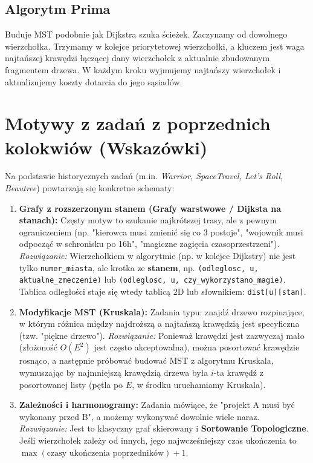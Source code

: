 \documentclass[12pt, a4paper]{article}
\begin{document}
\subsection{Algorytm Prima}
Buduje MST podobnie jak Dijkstra szuka ścieżek. Zaczynamy od dowolnego wierzchołka. Trzymamy w kolejce priorytetowej wierzchołki, a kluczem jest waga najtańszej krawędzi łączącej dany wierzchołek z aktualnie zbudowanym fragmentem drzewa. W każdym kroku wyjmujemy najtańszy wierzchołek i aktualizujemy koszty dotarcia do jego sąsiadów.

\section{Motywy z zadań z poprzednich kolokwiów (Wskazówki)}

Na podstawie historycznych zadań (m.in. \textit{Warrior, SpaceTravel, Let's Roll, Beautree}) powtarzają się konkretne schematy:

\begin{enumerate}
    \item \textbf{Grafy z rozszerzonym stanem (Grafy warstwowe / Dijksta na stanach):}
    Częsty motyw to szukanie najkrótszej trasy, ale z pewnym ograniczeniem (np. "kierowca musi zmienić się co 3 postoje", "wojownik musi odpocząć w schronisku po 16h", "magiczne zagięcia czasoprzestrzeni").
    \textit{Rozwiązanie:} Wierzchołkiem w algorytmie (np. w kolejce Dijkstry) nie jest tylko \texttt{numer\_miasta}, ale krotka ze \textbf{stanem}, np. \texttt{(odleglosc, u, aktualne\_zmeczenie)} lub \texttt{(odleglosc, u, czy\_wykorzystano\_magie)}. Tablica odległości staje się wtedy tablicą 2D lub słownikiem: \texttt{dist[u][stan]}.
    
    \item \textbf{Modyfikacje MST (Kruskala):}
    Zadania typu: znajdź drzewo rozpinające, w którym różnica między najdroższą a najtańszą krawędzią jest specyficzna (tzw. "piękne drzewo"). 
    \textit{Rozwiązanie:} Ponieważ krawędzi jest zazwyczaj mało (złożoność $O(E^2)$ jest często akceptowalna), można posortować krawędzie rosnąco, a następnie próbować budować MST z algorytmu Kruskala, wymuszając by najmniejszą krawędzią drzewa była $i$-ta krawędź z posortowanej listy (pętla po $E$, w środku uruchamiamy Kruskala).
    
    \item \textbf{Zależności i harmonogramy:}
    Zadania mówiące, że "projekt A musi być wykonany przed B", a możemy wykonywać dowolnie wiele naraz. 
    \textit{Rozwiązanie:} Jest to klasyczny graf skierowany i \textbf{Sortowanie Topologiczne}. Jeśli wierzchołek zależy od innych, jego najwcześniejszy czas ukończenia to $\max(\text{czasy ukończenia poprzedników}) + 1$.
\end{enumerate}
\end{document}
